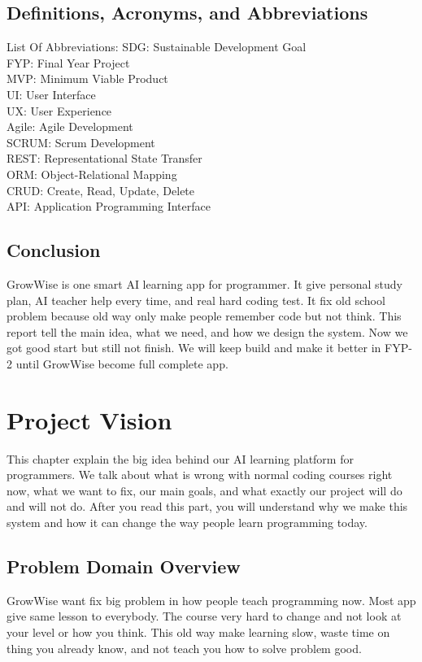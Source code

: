 \documentclass{FastFyp}
\begin{document}
\section{Definitions, Acronyms, and Abbreviations}
List Of Abbreviations:  
SDG: Sustainable Development Goal\\
FYP: Final Year Project\\
MVP: Minimum Viable Product\\
UI: User Interface\\
UX: User Experience\\
Agile: Agile Development\\
SCRUM: Scrum Development\\
REST: Representational State Transfer\\
ORM: Object-Relational Mapping\\
CRUD: Create, Read, Update, Delete\\
API: Application Programming Interface

\section{Conclusion}

GrowWise is one smart AI learning app for programmer. It give personal study plan, AI teacher help every time, and real hard coding test. It fix old school problem because old way only make people remember code but not think. This report tell the main idea, what we need, and how we design the system. Now we got good start but still not finish. We will keep build and make it better in FYP-2 until GrowWise become full complete app.



\chapter{Project Vision}

This chapter explain the big idea behind our AI learning platform for programmers. We talk about what is wrong with normal coding courses right now, what we want to fix, our main goals, and what exactly our project will do and will not do. After you read this part, you will understand why we make this system and how it can change the way people learn programming today.

\section{Problem Domain Overview}
GrowWise want fix big problem in how people teach programming now. Most app give same lesson to everybody. The course very hard to change and not look at your level or how you think. This old way make learning slow, waste time on thing you already know, and not teach you how to solve problem good.
\end{document}
